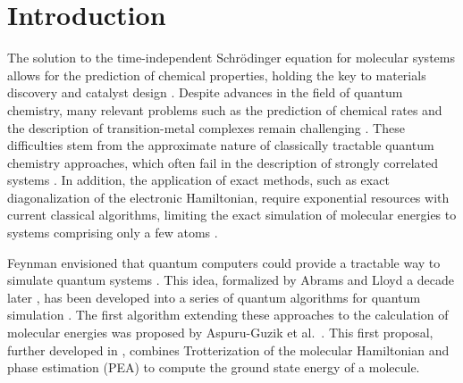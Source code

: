 \documentclass[superscriptaddress,aps,pra,twocolumn,nofootinbib,babel]{revtex4-1}
\begin{document}
\section*{Introduction}

The solution to the time-independent Schr\"odinger equation for molecular systems allows for the prediction of chemical properties, holding the key to materials discovery and catalyst design \cite{Curtarolo.NM.12.191.2013,huskinson.N.505.7482.2014,Su.CS.6.885.2015,hachmann.JPCL.2.2241.2011}. Despite advances in the field of quantum chemistry, many relevant problems such as the prediction of chemical rates and the description of transition-metal complexes remain challenging \cite{Bell.MP.102.319.2004,marti.PCCP.13.6750.2011}. These difficulties stem from the approximate nature of classically tractable quantum chemistry approaches, which often fail in the description of strongly correlated systems \cite{Lyakh.CR.112.182.2011,Szalay.CR.112.108.2011}. In addition, the application of exact methods, such as exact diagonalization of the electronic Hamiltonian, require exponential resources with current classical algorithms, limiting the exact simulation of molecular energies to systems comprising only a few atoms \cite{Head-Gordon.PT.61.58.2008a,Helgaker2013}.

Feynman envisioned that quantum computers could provide a tractable way to simulate quantum systems \cite{Feynman.IJTP.21.467.1982}. This idea, formalized by Abrams and Lloyd a decade later \cite{Abrams.PRL.79.2586.1997}, has been developed into a series of quantum algorithms for quantum simulation \cite{Georgescu.RMP.86.153.2014,Kassal.ARPC.62.185.2011,Yung.2014.Chapter}. The first algorithm extending these approaches to the calculation of molecular energies was proposed by Aspuru-Guzik et al.~\cite{Aspuru-Guzik.S.309.1704.2005}. This first proposal, further developed in \cite{Whitfield.MP.109.735.2011}, combines Trotterization of the molecular Hamiltonian and phase estimation (PEA) to compute the ground state energy of a molecule. 
\end{document}
